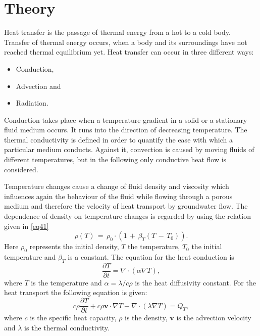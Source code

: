 \section{Theory}

Heat transfer is the passage of thermal energy from a hot to a cold body. Transfer of thermal energy occurs, when a body and its surroundings have not reached thermal equilibrium yet. Heat transfer can occur in three different ways:
\begin{itemize}
\item Conduction,
\item Advection and
\item Radiation.
\end{itemize}
Conduction takes place when a temperature gradient in a solid or a stationary fluid medium occurs. It runs into the direction of decreasing temperature. The thermal conductivity is defined in order to quantify the ease with which a particular medium conducts. Against it, convection is caused by moving fluids of different temperatures, but in the following only conductive heat flow is considered.

Temperature changes cause a change of fluid density and viscosity which influences again the behaviour of the fluid while flowing through a porous medium and therefore the velocity of heat transport by groundwater flow.
The dependence of density on temperature changes is regarded by using the relation given in \eqref{eq41}
\begin{equation}
\rho(T)\, = \,\rho_0\cdot\left(1\,+\,\beta_T\left(T\,-\,T_0\right)\right).
\label{eq41}
\end{equation}
Here $\rho_0$ represents the initial density, $T$ the temperature, $T_0$ the initial temperature and $\beta_T$ is a constant.
The equation for the heat conduction is
\begin{equation}
\frac{\partial T}{\partial t} = \nabla\cdot(\alpha\nabla T),
\label{EqHT}
\end{equation}
where $T$ is the temperature and $\alpha = \lambda/c\rho$ is the heat diffusivity constant.
For the heat transport the following equation is given:
\begin{equation}
c\rho\frac{\partial T}{\partial t} + c\rho \mathbf v \cdot \nabla T - \nabla\cdot(\lambda\nabla T) = Q_T,
\end{equation}
where $c$ is the specific heat capacity, $\rho$ is the density, $\mathbf v$ is the advection velocity and $\lambda$ is the thermal conductivity.
